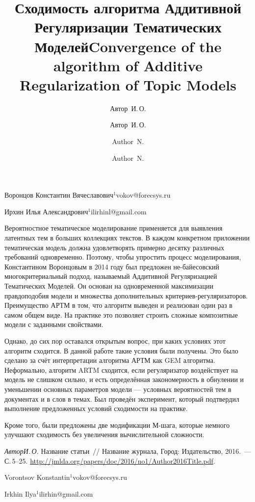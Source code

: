 \documentclass[twoside]{article}
\begin{document}
\title{Сходимость алгоритма Аддитивной Регуляризации Тематических Моделей}
\author{Автор~И.\,О.}{Воронцов Константин Вячеславович$^1$}{vokov@forecsys.ru}
\author{Автор~И.\,О.}{Ирхин Илья Александрович$^{1}$\speaker}{ilirhinl@gmail.com}
\Russian
\maketitle

Вероятностное тематическое моделирование применяется для выявления  латентных тем в больших коллекциях текстов. В каждом конкретном приложении тематическая модель должна удовлетворять примерно десятку различных требований одновременно. Поэтому, чтобы упростить процесс моделирования, Константином Воронцовым в 2014 году был предложен не-байесовский многокритериальный подход, называемый Аддитивной Регуляризацией Тематических Моделей. Он основан на одновременной максимизации правдоподобия модели и множества дополнительных критериев-регуляризаторов. Преимущество АРТМ в том, что алгоритм выведен и реализован один раз в самом общем виде. На практике это позволяет строить сложные композитные модели с заданными свойствами.

Однако, до сих пор оставался открытым вопрос, при каких условиях этот алгоритм сходится. В данной работе такие условия были получены. Это было сделано за счёт интерпретации алгоритма АРТМ как GEM алгоритма. Неформально, алгоритм ARTM сходится, если регуляризатор воздействует на модель не слишком сильно, и есть определённая закономерность в обнулении и уменьшении основных параметров модели --- условных вероятностей тем в документах и в слов в темах. Был проведён эксперимент, который подтвердил выполнение предложенных условий сходимости на практике.

 Кроме того, были предложены две модификации М-шага, которые немного улучшают сходимость без увеличения вычислительной сложности. 

\begin{thebibliography}{1}
    \emph{Автор\;И.\,О.}
    Название статьи~//
    Название журнала,
    Город: Издательство, 2016.~--- С.\,5--25. %
    \url{http://jmlda.org/papers/doc/2016/no1/Author2016Title.pdf}.
\end{thebibliography}


\title{Convergence of the algorithm of Additive Regularization of Topic Models }
\author{Author~N.}{Vorontsov Konstantin$^{1}$}{vokov@forecsys.ru}
\author{Author~N.}{Irkhin Ilya$^{1}$\speaker}{ilirhin@gmail.com}
\English
\maketitle
\end{document}
